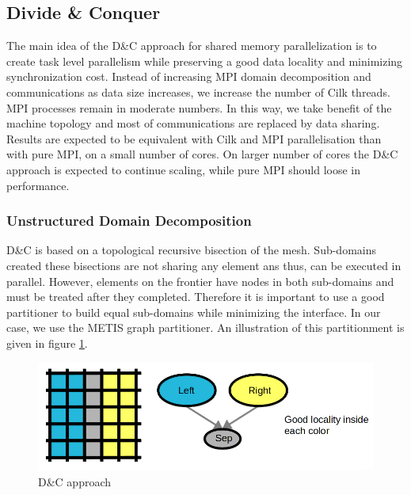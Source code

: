 \documentclass{IOS-Book-Article}
\begin{document}
\subsection{Divide \& Conquer}
The main idea of the D\&C approach for shared memory parallelization is to create task level parallelism while preserving a good data locality and minimizing synchronization cost.
Instead of increasing MPI domain decomposition and communications as data size increases, we increase the number of Cilk threads. MPI processes remain in moderate numbers.
In this way, we take benefit of the machine topology and most of communications are replaced by data sharing.
Results are expected to be equivalent with Cilk and MPI parallelisation than with pure MPI, on a small number of cores.
On larger number of cores the D\&C approach is expected to continue scaling, while pure MPI should loose in performance.

\subsubsection{Unstructured Domain Decomposition}
D\&C is based on a topological recursive bisection of the mesh. Sub-domains created these bisections are not sharing any element ans thus, can be executed in parallel.
However, elements on the frontier have nodes in both sub-domains and must be treated after they completed.
Therefore it is important to use a good partitioner to build equal sub-domains while minimizing the interface. In our case, we use the METIS graph partitioner.
An illustration of this partitionment is given in figure \ref{fig:DCapp}.
\begin{figure}[htp]
 \centering
 \includegraphics[scale=0.25]{DC_approach.png}
 \caption{D\&C approach}
 \label{fig:DCapp}
\end{figure}
 
\end{document}
